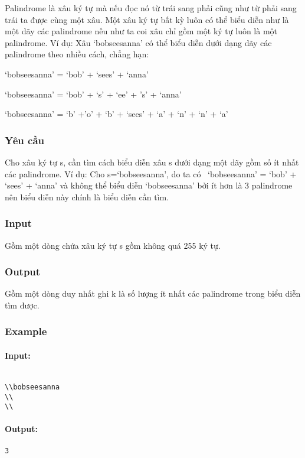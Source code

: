 



   Palindrome là xâu ký tự mà nếu đọc nó từ trái sang phải cũng như từ phải sang trái ta được cùng một xâu. Một xâu ký tự bất kỳ luôn có thể biểu diễn như là một dãy các palindrome nếu như ta coi xâu chỉ gồm một ký tự luôn là một palindrome. Ví dụ: Xâu ‘bobseesanna’ có thể biểu diễn dưới dạng dãy các palindrome theo nhiều cách, chẳng hạn:  

   ‘bobseesanna’ = ‘bob’ + ‘sees’ + ‘anna’  

   ‘bobseesanna’ = ‘bob’ + ‘s’ + ‘ee’ + ’s’ + ‘anna’  

   ‘bobseesanna’ = ‘b’ +’o’ + ‘b’ + ‘sees’ + ‘a’ + ‘n’ + ‘n’ + ‘a’  

\subsubsection{   Yêu cầu  }

   Cho xâu ký tự s, cần tìm cách biểu diễn xâu s dưới dạng một dãy gồm số ít nhất các palindrome. Ví dụ: Cho s=‘bobseesanna’, do ta có  ‘bobseesanna’ = ‘bob’ + ‘sees’ + ‘anna’ và không thể biểu diễn ‘bobseesanna’ bởi ít hơn là 3 palindrome nên biểu diễn này chính là biểu diễn cần tìm.  

\subsubsection{   Input  }

   Gồm một dòng chứa xâu ký tự s gồm không quá 255 ký tự.  

\subsubsection{   Output  }

   Gồm một dòng duy nhất ghi k là số lượng ít nhất các palindrome trong biểu diễn tìm được.  

\subsubsection{   Example  }

\paragraph{\textbf{    Input:   }}
\begin{verbatim}

\\bobseesanna
\\
\\\end{verbatim}

\paragraph{   Output:  }
\begin{verbatim}
3\end{verbatim}